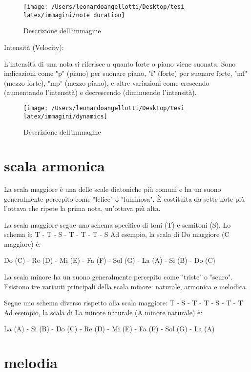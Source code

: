 \documentclass[a4paper,12pt]{report}
\begin{document}
\begin{figure}[h!]
    \centering
    \texttt{[image: /Users/leonardoangellotti/Desktop/tesi latex/immagini/note duration]} 
    \caption{Descrizione dell'immagine}
    \label{fig:immagine}
\end{figure}

Intensità (Velocity):

L'intensità di una nota si riferisce a quanto forte o piano viene suonata.
Sono indicazioni come "p" (piano) per suonare piano, "f" (forte) per suonare forte, "mf" (mezzo forte), "mp" (mezzo piano), e altre variazioni come crescendo (aumentando l'intensità) e decrescendo (diminuendo l'intensità).

\begin{figure}[h!]
    \centering
    \texttt{[image: /Users/leonardoangellotti/Desktop/tesi latex/immagini/dynamics]} 
    \caption{Descrizione dell'immagine}
    \label{fig:immagine}
\end{figure}

\section{scala armonica}

La scala maggiore è una delle scale diatoniche più comuni e ha un suono generalmente percepito come "felice" o "luminosa". È costituita da sette note più l'ottava che ripete la prima nota, un'ottava più alta.

La scala maggiore segue uno schema specifico di toni (T) e semitoni (S). Lo schema è:
T - T - S - T - T - T - S
Ad esempio, la scala di Do maggiore (C maggiore) è:

Do (C) - Re (D) - Mi (E) - Fa (F) - Sol (G) - La (A) - Si (B) - Do (C)

La scala minore ha un suono generalmente percepito come "triste" o "scuro". Esistono tre varianti principali della scala minore: naturale, armonica e melodica.

Segue uno schema diverso rispetto alla scala maggiore:
T - S - T - T - S - T - T
Ad esempio, la scala di La minore naturale (A minore naturale) è:

La (A) - Si (B) - Do (C) - Re (D) - Mi (E) - Fa (F) - Sol (G) - La (A)

\section{melodia}
\end{document}
